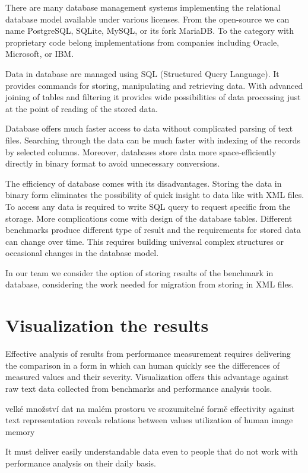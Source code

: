 There are many database management systems implementing the relational database
model available under various licenses. From the open-source we can name
PostgreSQL, SQLite, MySQL, or its fork MariaDB. To the category with proprietary
code belong implementations from companies including Oracle, Microsoft, or IBM.

Data in database are managed using SQL (Structured Query Language). It provides
commands for storing, manipulating and retrieving data. With advanced joining of
tables and filtering it provides wide possibilities of data processing just at
the point of reading of the stored data.

Database offers much faster access to data without complicated parsing of text
files. Searching through the data can be much faster with indexing of the
records by selected columns. Moreover, databases store data more
space-efficiently directly in binary format to avoid unnecessary conversions.

The efficiency of database comes with its disadvantages. 
Storing the data in binary form eliminates the possibility of quick insight to
data like with XML files. To access any data is required to write SQL query to
request specific from the storage.
More complications come with design of the database tables. Different benchmarks
produce different type of result and the requirements for stored data can change
over time. This requires building universal complex structures or occasional
changes in the database model.

In our team we consider the option of storing results of the benchmark in
database, considering the work needed for migration from storing in XML files.

\section{Visualization the results} \label{ch:visualization}
Effective analysis of results from performance measurement requires delivering
the comparison in a form in which can human quickly see the differences of
measured values and their severity. Visualization offers this advantage against
raw text data collected from benchmarks and performance analysis tools.

velké množství dat  na malém prostoru  ve srozumitelné formě
effectivity against text representation
reveals relations between values
utilization of human image memory

It must deliver easily understandable data even to people that do not work with
performance analysis on their daily basis.

